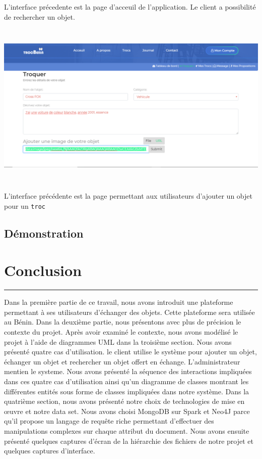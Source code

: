 \documentclass[12pt]{report}
\begin{document}
	L'interface précedente est la page d'acceuil de l'application. Le client a possibilité de rechercher un objet.
	


\begin{center}
	\includegraphics[scale=0.5, height=8cm]{troquer}
\end{center}
	L'interface précédente est la page permettant aux utilisateurs d'ajouter un objet pour un {\tt troc}
	
	\subsection{\sc Démonstration}
	
	

	\newpage
	\section{\sc Conclusion}
		\rule{1 \textwidth}{0.5pt} \textbf{}
		\vspace{2em}
		
	Dans la première partie de ce travail, nous avons introduit une plateforme permettant à ses utilisateurs d’échanger des objets. Cette plateforme sera utilisée au Bénin. Dans la deuxième partie, nous présentons avec plus de précision le contexte du projet. Après avoir examiné le contexte, nous avons modélisé le projet à l'aide de diagrammes UML dans la troisième section. Nous avons présenté quatre cas d'utilisation. le client utilise le système pour ajouter un objet, échanger un objet et rechercher un objet offert en échange. L'administrateur mentien le systeme. Nous avons présenté la séquence des interactions impliquées dans ces quatre cas d'utilisation ainsi qu'un diagramme de classes montrant les différentes entités sous forme de classes impliquées dans notre système. Dans la quatrième section, nous avons présenté notre choix de technologies de mise en œuvre et notre data set. Nous avons choisi MongoDB sur Spark et Neo4J parce qu’il propose un langage de requête riche permettant d’effectuer des manipulations complexes sur chaque attribut du document. Nous avons ensuite présenté quelques captures d'écran de la hiérarchie des fichiers de notre projet et quelques captures d'interface.
			
\end{document}
